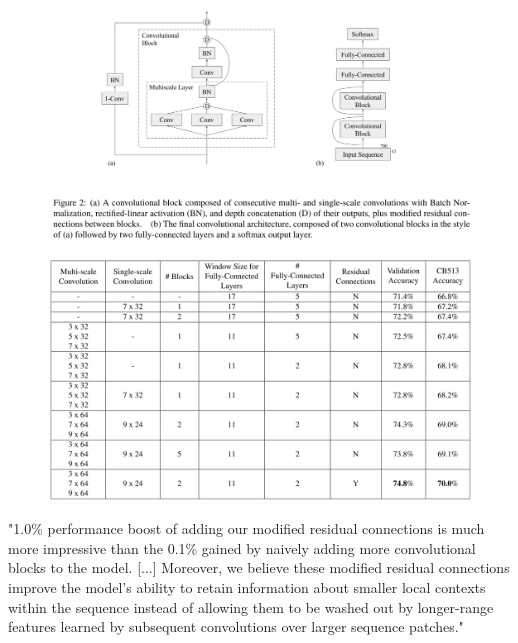 \documentclass[]{scrartcl}
\begin{document}
\begin{figure}
	\centering
	\includegraphics[width=1\linewidth]{busiacnn}
	\label{fig:busiacnn}
\end{figure}
\begin{figure}
	\centering
	\includegraphics[width=1\linewidth]{filtersbusia}
\end{figure}
"1.0\% performance boost of adding our modified residual connections is much more impressive than the 0.1\% gained by naively adding more convolutional blocks to the model. [...] Moreover, we believe these modified residual connections improve the model’s ability to retain information about smaller local contexts within the sequence instead of allowing them to be washed out by longer-range features learned by subsequent convolutions over larger sequence patches." \cite{Busia2017}
\end{document}
